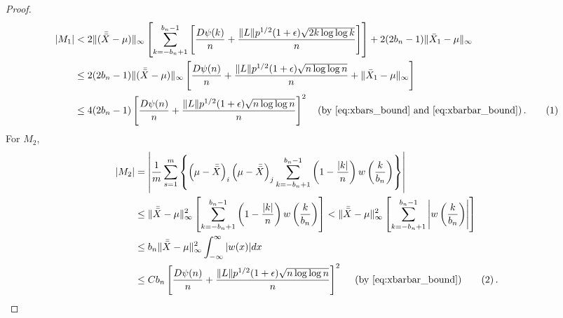 \documentclass[11pt]{article}
\newcommand\numberthis{\addtocounter{equation}{1}\tag{\theequation}}
\theoremstyle{remark}
\begin{document}
\begin{proof}
\begin{align*}
|M_1|
    & < 2\|(\bar{\bar{X}} - \mu)\|_{\infty} \left[\sum\limits_{k=-b_n + 1}^{b_n-1}\left[ \dfrac{D \psi(k)}{n} + \dfrac{\|L\| p^{1/2}(1+\epsilon)\sqrt{2k \log\log k}}{n}  \right] \right]  + 2(2b_n - 1) \|\bar{X}_1 - \mu\|_{\infty} \\
    &\leq 2(2b_n - 1)\|(\bar{\bar{X}} - \mu)\|_{\infty} \left[ \dfrac{D \psi(n)}{n} + \dfrac{\|L\| p^{1/2}(1+\epsilon)\sqrt{n \log\log n}}{n} + \|\bar{X}_1 - \mu\|_{\infty}  \right]\\
    & \leq 4(2b_n - 1)\left[ \dfrac{D \psi(n)}{n} + \dfrac{\|L\| p^{1/2}(1+\epsilon)\sqrt{n \log\log n}}{n}  \right]^2  \quad \text{(by \eqref{eq:xbars_bound} and \eqref{eq:xbarbar_bound})}\,. \numberthis \label{eq:strong_consis_term-1}
\end{align*}
%
%
For $M_2$,
\begin{align*}
   |M_2| & = \left|\dfrac{1}{m}\sum\limits_{s=1}^{m}\left\{ \left(\mu - \bar{\bar{X}} \right)_i  \left(\mu - \bar{\bar{X}} \right)_j\sum_{k=-b_n+1}^{b_n-1}\left(1-\dfrac{|k|}{n}\right)w\left(\dfrac{k}{b_n}\right)\right\}\right|\\
    & \leq\|\bar{\bar{X}} - \mu\|_{\infty}^2\left[\sum_{k=-b_n+1}^{b_n-1}\left(1-\dfrac{|k|}{n}\right)w\left(\dfrac{k}{b_n}\right)\right] < \|\bar{\bar{X}} - \mu\|_{\infty}^2\left[\sum_{k=-b_n+1}^{b_n-1}\left|w\left(\dfrac{k}{b_n}\right)\right|\right]\\
    & \leq b_n\|\bar{\bar{X}} - \mu\|_{\infty}^2 \int_{-\infty}^{\infty}|w(x)|dx \\
    & \leq Cb_n\left[ \dfrac{D \psi(n)}{n} + \dfrac{\|L\| p^{1/2}(1+\epsilon)\sqrt{n \log\log n}}{n}  \right]^2 \quad \text{ (by \eqref{eq:xbarbar_bound})} \numberthis \label{eq:strong_consis_term-2} \,.

\end{align*}
\end{proof}
\end{document}
